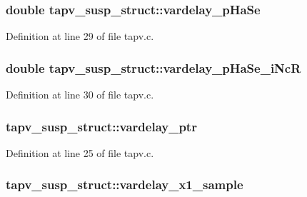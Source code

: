 \subsubsection[{\texorpdfstring{vardelay\+\_\+p\+Ha\+Se}{vardelay_pHaSe}}]{\setlength{\rightskip}{0pt plus 5cm}double tapv\+\_\+susp\+\_\+struct\+::vardelay\+\_\+p\+Ha\+Se}\hypertarget{structtapv__susp__struct_abe1f49d998e0dbc2a90a928cb9cb6a05}{}\label{structtapv__susp__struct_abe1f49d998e0dbc2a90a928cb9cb6a05}


Definition at line 29 of file tapv.\+c.

\subsubsection[{\texorpdfstring{vardelay\+\_\+p\+Ha\+Se\+\_\+i\+NcR}{vardelay_pHaSe_iNcR}}]{\setlength{\rightskip}{0pt plus 5cm}double tapv\+\_\+susp\+\_\+struct\+::vardelay\+\_\+p\+Ha\+Se\+\_\+i\+NcR}\hypertarget{structtapv__susp__struct_afc7c279a75184d2d5e1f0f3b518e84ce}{}\label{structtapv__susp__struct_afc7c279a75184d2d5e1f0f3b518e84ce}


Definition at line 30 of file tapv.\+c.

\subsubsection[{\texorpdfstring{vardelay\+\_\+ptr}{vardelay_ptr}}]{ tapv\+\_\+susp\+\_\+struct\+::vardelay\+\_\+ptr}\hypertarget{structtapv__susp__struct_a5cf604bd79b54fefa5c5edfebf2df120}{}\label{structtapv__susp__struct_a5cf604bd79b54fefa5c5edfebf2df120}


Definition at line 25 of file tapv.\+c.

\subsubsection[{\texorpdfstring{vardelay\+\_\+x1\+\_\+sample}{vardelay_x1_sample}}]{ tapv\+\_\+susp\+\_\+struct\+::vardelay\+\_\+x1\+\_\+sample}\hypertarget{structtapv__susp__struct_a43b4d7f22d0eabe0957d21fdd5da7d52}{}\label{structtapv__susp__struct_a43b4d7f22d0eabe0957d21fdd5da7d52}


